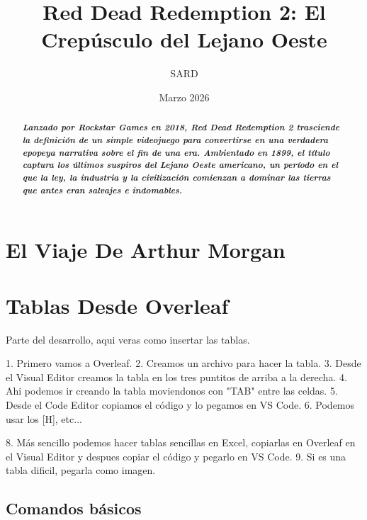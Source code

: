 \documentclass[12pt, letterpaper]{article} %
\title{Red Dead Redemption 2: El Crepúsculo del Lejano Oeste} %
\author{SARD}
\date{Marzo 2026}
\begin{document}
\maketitle

\tableofcontents

\begin{abstract} %
    \textbf{\textit{Lanzado por Rockstar Games en 2018, Red Dead Redemption 2 trasciende la 
    definición de un simple videojuego para convertirse en una verdadera epopeya 
    narrativa sobre el fin de una era. Ambientado en 1899, el título captura los 
    últimos suspiros del Lejano Oeste americano, un período en el que la ley, la 
    industria y la civilización comienzan a dominar las tierras que antes eran 
    salvajes e indomables.}}
\end{abstract}






\section{El Viaje De Arthur Morgan}

\section{Tablas Desde Overleaf}
Parte del desarrollo, aqui veras como insertar las tablas.

1. Primero vamos a Overleaf.
2. Creamos un archivo para hacer la tabla.
3. Desde el Visual Editor creamos la tabla en los tres puntitos de arriba a la derecha.
4. Ahi podemos ir creando la tabla moviendonos con "TAB" entre las celdas.
5. Desde el Code Editor copiamos el código y lo pegamos en VS Code.
6. Podemos usar los [H], etc...

8. Más sencillo podemos hacer tablas sencillas en Excel, copiarlas en Overleaf en el Visual Editor y despues copiar el código y pegarlo en VS Code.
9. Si es una tabla dificil, pegarla como imagen.


\subsection{Comandos básicos}
\end{document}

